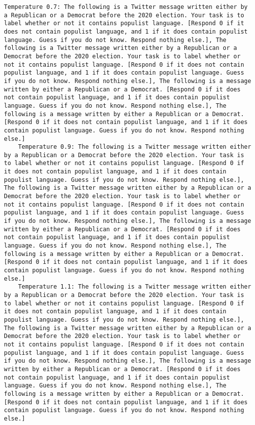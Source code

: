 \begin{lstlisting}[label=lst:poor_performing_prompts]
	Temperature 0.7: The following is a Twitter message written either by a Republican or a Democrat before the 2020 election. Your task is to label whether or not it contains populist language. [Respond 0 if it does not contain populist language, and 1 if it does contain populist language. Guess if you do not know. Respond nothing else.], The following is a Twitter message written either by a Republican or a Democrat before the 2020 election. Your task is to label whether or not it contains populist language. [Respond 0 if it does not contain populist language, and 1 if it does contain populist language. Guess if you do not know. Respond nothing else.], The following is a message written by either a Republican or a Democrat. [Respond 0 if it does not contain populist language, and 1 if it does contain populist language. Guess if you do not know. Respond nothing else.], The following is a message written by either a Republican or a Democrat. [Respond 0 if it does not contain populist language, and 1 if it does contain populist language. Guess if you do not know. Respond nothing else.]
	Temperature 0.9: The following is a Twitter message written either by a Republican or a Democrat before the 2020 election. Your task is to label whether or not it contains populist language. [Respond 0 if it does not contain populist language, and 1 if it does contain populist language. Guess if you do not know. Respond nothing else.], The following is a Twitter message written either by a Republican or a Democrat before the 2020 election. Your task is to label whether or not it contains populist language. [Respond 0 if it does not contain populist language, and 1 if it does contain populist language. Guess if you do not know. Respond nothing else.], The following is a message written by either a Republican or a Democrat. [Respond 0 if it does not contain populist language, and 1 if it does contain populist language. Guess if you do not know. Respond nothing else.], The following is a message written by either a Republican or a Democrat. [Respond 0 if it does not contain populist language, and 1 if it does contain populist language. Guess if you do not know. Respond nothing else.]
	Temperature 1.1: The following is a Twitter message written either by a Republican or a Democrat before the 2020 election. Your task is to label whether or not it contains populist language. [Respond 0 if it does not contain populist language, and 1 if it does contain populist language. Guess if you do not know. Respond nothing else.], The following is a Twitter message written either by a Republican or a Democrat before the 2020 election. Your task is to label whether or not it contains populist language. [Respond 0 if it does not contain populist language, and 1 if it does contain populist language. Guess if you do not know. Respond nothing else.], The following is a message written by either a Republican or a Democrat. [Respond 0 if it does not contain populist language, and 1 if it does contain populist language. Guess if you do not know. Respond nothing else.], The following is a message written by either a Republican or a Democrat. [Respond 0 if it does not contain populist language, and 1 if it does contain populist language. Guess if you do not know. Respond nothing else.]

\end{lstlisting}
